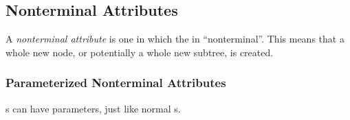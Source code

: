 \subsection{Nonterminal Attributes}\label{subsec:Nonterminal_Attributes}
\begin{definition}\label{def:Nonterminal_Attribute}
  A \emph{nonterminal attribute} is one in which the  in ``nonterminal''.
  This means that a whole new node, or potentially a whole new subtree, is created.
\end{definition}
\subsubsection{Parameterized Nonterminal Attributes}\label{subsubsec:Parameterized_Nonterminal_Attributes}
s can have parameters, just like normal s.

